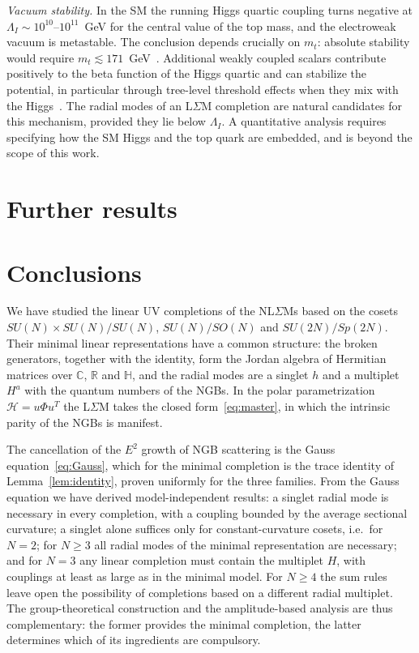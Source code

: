 \documentclass[aps,prd,twocolumn,superscriptaddress,nofootinbib,floatfix]{revtex4-2}
\theoremstyle{remark}
\newcommand{\Hf}{\mathcal{H}}      %
\newcommand{\ie}{i.e.}
\begin{document}
\emph{Vacuum stability.} In the SM the running Higgs quartic coupling turns negative at $\Lambda_I\sim10^{10}$--$10^{11}$~GeV for the central value of the top mass, and the electroweak vacuum is metastable. The conclusion depends crucially on $m_t$: absolute stability would require $m_t\lesssim171$~GeV~\cite{Sher:1988mj,Degrassi:2012ry,Buttazzo:2013uya}. Additional weakly coupled scalars contribute positively to the beta function of the Higgs quartic and can stabilize the potential, in particular through tree-level threshold effects when they mix with the Higgs~\cite{Elias-Miro:2012eoi,Lebedev:2012zw}. The radial modes of an L$\Sigma$M completion are natural candidates for this mechanism, provided they lie below $\Lambda_I$. A quantitative analysis requires specifying how the SM Higgs and the top quark are embedded, and is beyond the scope of this work.

\section{Further results}
\label{sec:further}


\section{Conclusions}
\label{sec:conclusions}

We have studied the linear UV completions of the NL$\Sigma$Ms based on the cosets $SU(N)\times SU(N)/SU(N)$, $SU(N)/SO(N)$ and $SU(2N)/Sp(2N)$. Their minimal linear representations have a common structure: the broken generators, together with the identity, form the Jordan algebra of Hermitian matrices over $\mathbb{C}$, $\mathbb{R}$ and $\mathbb{H}$, and the radial modes are a singlet $h$ and a multiplet $H^a$ with the quantum numbers of the NGBs. In the polar parametrization $\Hf=u\Phi u^T$ the L$\Sigma$M takes the closed form~\eqref{eq:master}, in which the intrinsic parity of the NGBs is manifest.

The cancellation of the $E^2$ growth of NGB scattering is the Gauss equation~\eqref{eq:Gauss}, which for the minimal completion is the trace identity of Lemma~\ref{lem:identity}, proven uniformly for the three families. From the Gauss equation we have derived model-independent results: a singlet radial mode is necessary in every completion, with a coupling bounded by the average sectional curvature; a singlet alone suffices only for constant-curvature cosets, \ie\ for $N=2$; for $N\ge3$ all radial modes of the minimal representation are necessary; and for $N=3$ any linear completion must contain the multiplet $H$, with couplings at least as large as in the minimal model. For $N\ge4$ the sum rules leave open the possibility of completions based on a different radial multiplet. The group-theoretical construction and the amplitude-based analysis are thus complementary: the former provides the minimal completion, the latter determines which of its ingredients are compulsory.
\end{document}
